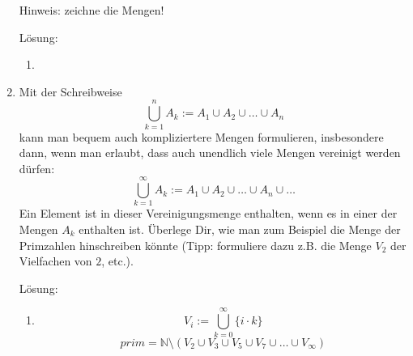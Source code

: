 \documentclass[main.tex]{subfiles}
\begin{document}
\begin{enumerate}
	      Hinweis: zeichne die Mengen!

	      Lösung:
	      \begin{enumerate}
		      \item
	      \end{enumerate}
	\item Mit der Schreibweise
	      \[ \bigcup_{k = 1}^{n} A_k := A_1 \cup A_2 \cup \dots \cup A_n \]
	      kann man bequem auch kompliziertere Mengen formulieren, insbesondere dann, wenn man
	      erlaubt, dass auch unendlich viele Mengen vereinigt werden dürfen:
	      \[ \bigcup_{k = 1}^{\infty} A_k := A_1 \cup A_2 \cup \dots \cup A_n \cup \dots \]
	      Ein Element ist in dieser Vereinigungsmenge enthalten, wenn es in einer der Mengen \( A_k \) enthalten ist.
	      Überlege Dir, wie man zum Beispiel die Menge der Primzahlen hinschreiben könnte
	      (Tipp: formuliere dazu z.B. die Menge \( V_2 \) der Vielfachen von \( 2 \), etc.).

	      Lösung:
	      \begin{enumerate}
		      \item
		            \[ V_i := \bigcup_{k = 0}^{\infty} \{i \cdot k\} \]
		            \[ prim = \mathbb{N} \setminus (V_2 \cup V_3 \cup V_5 \cup V_7 \cup \dots \cup V_\infty)  \]
	      \end{enumerate}
\end{enumerate}
\end{document}
